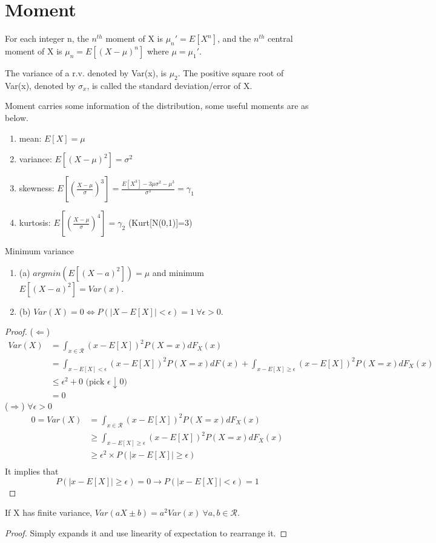 \documentclass[11pt]{article}
\begin{document}
\section{Moment}
\begin{definition}
For each integer n, the $n^{th}$ moment of X is $\mu_n'=E[X^n]$, and the $n^{th}$ central moment of X is $\mu_n=E[(X-\mu)^n]$ where $\mu=\mu_1'$.
\end{definition}
\begin{definition}
The variance of a r.v. denoted by Var(x), is $\mu_2$. The positive square root of Var(x), denoted by $\sigma_x$, is called the standard deviation/error of X.  
\end{definition}
Moment carries some information of the distribution, some useful moments are as below. 
\begin{enumerate}
\item mean: $E[X]=\mu$
\item variance: $E[(X-\mu)^2]=\sigma^2$
\item skewness: $E[(\frac{X-\mu}{\sigma})^3]=\frac{E[X^3]-3\mu\sigma^2-\mu^3}{\sigma^3}=\gamma_1$
\item kurtosis: $E[(\frac{X-\mu}{\sigma})^4]=\gamma_2$     \hspace{3pt} (Kurt[N(0,1)]=3)
\end{enumerate}
\begin{property} Minimum variance 
\begin{enumerate}
		\item(a) $argmin(E[(X-a)^2])=\mu$ and minimum $E[(X-a)^2]=Var(x).$
		\item(b) $Var(X)=0\Leftrightarrow P(|X-E[X]|<\epsilon)=1\ \forall\epsilon>0$. 
\end{enumerate}
	\begin{proof}
	($\Leftarrow$)
	\begin{align*}
	Var(X)&=\int_{x\in\mathcal{R}}(x-E[X])^2P(X=x)dF_X(x)\\
	&=\int_{x-E[X]<\epsilon}(x-E[X])^2P(X=x)dF(x)+\int_{x-E[X]\geq\epsilon}(x-E[X])^2P(X=x)dF_X(x)\\
	&\leq \epsilon^2 +0 \mbox{       (pick $\epsilon\downarrow 0)$}\\
	&=0
	\end{align*}
	($\Rightarrow$) $\forall\epsilon>0$
		\begin{align*}
	0=Var(X)&=\int_{x\in\mathcal{R}}(x-E[X])^2P(X=x)dF_X(x)\\
	&\geq\int_{x-E[X]\geq\epsilon}(x-E[X])^2P(X=x)dF_X(x)\\
	&\geq \epsilon^2\times P(|x-E[X]|\geq\epsilon)\\
	\end{align*}
	It implies that
	$$P(|x-E[X]|\geq\epsilon)=0\rightarrow P(|x-E[X]|< \epsilon)=1$$
	\end{proof}
\end{property}
\begin{property}If X has finite variance, $Var(aX\pm b)=a^2Var(x)\ \forall a,b\in\mathcal{R}.$
\end{property}
\begin{proof}
Simply expands it and use linearity of expectation to rearrange it.
\end{proof}
\end{document}

